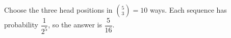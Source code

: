 Choose the three head positions in $\binom53=10 $ ways. Each sequence has probability $\dfrac{1}{2^5}$, so the answer is $\boxed{\dfrac{5}{16}}$.
